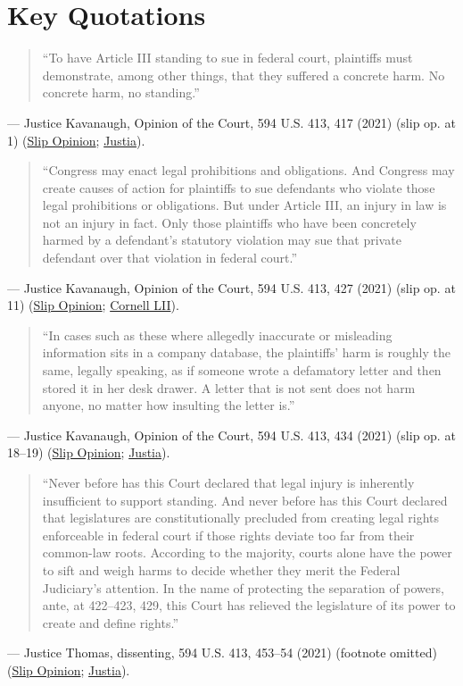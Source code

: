 \documentclass[12pt]{article}
\begin{document}
\section{Key Quotations}

\begin{quote}
``To have Article III standing to sue in federal court, plaintiffs must demonstrate, among other things, that they suffered a concrete harm. No concrete harm, no standing.''
\end{quote}
\noindent --- Justice Kavanaugh, Opinion of the Court, 594 U.S. 413, 417 (2021) (slip op. at 1) (\href{https://www.supremecourt.gov/opinions/20pdf/20-297_4g25.pdf}{Slip Opinion}; \href{https://supreme.justia.com/cases/federal/us/594/20-297/}{Justia}).

\begin{quote}
``Congress may enact legal prohibitions and obligations. And Congress may create causes of action for plaintiffs to sue defendants who violate those legal prohibitions or obligations. But under Article III, an injury in law is not an injury in fact. Only those plaintiffs who have been concretely harmed by a defendant's statutory violation may sue that private defendant over that violation in federal court.''
\end{quote}
\noindent --- Justice Kavanaugh, Opinion of the Court, 594 U.S. 413, 427 (2021) (slip op. at 11) (\href{https://www.supremecourt.gov/opinions/20pdf/20-297_4g25.pdf}{Slip Opinion}; \href{https://www.law.cornell.edu/supremecourt/text/20-297}{Cornell LII}).

\begin{quote}
``In cases such as these where allegedly inaccurate or misleading information sits in a company database, the plaintiffs' harm is roughly the same, legally speaking, as if someone wrote a defamatory letter and then stored it in her desk drawer. A letter that is not sent does not harm anyone, no matter how insulting the letter is.''
\end{quote}
\noindent --- Justice Kavanaugh, Opinion of the Court, 594 U.S. 413, 434 (2021) (slip op. at 18--19) (\href{https://www.supremecourt.gov/opinions/20pdf/20-297_4g25.pdf}{Slip Opinion}; \href{https://supreme.justia.com/cases/federal/us/594/20-297/}{Justia}).

\begin{quote}
``Never before has this Court declared that legal injury is inherently insufficient to support standing. And never before has this Court declared that legislatures are constitutionally precluded from creating legal rights enforceable in federal court if those rights deviate too far from their common-law roots. According to the majority, courts alone have the power to sift and weigh harms to decide whether they merit the Federal Judiciary's attention. In the name of protecting the separation of powers, ante, at 422--423, 429, this Court has relieved the legislature of its power to create and define rights.''
\end{quote}
\noindent --- Justice Thomas, dissenting, 594 U.S. 413, 453--54 (2021) (footnote omitted) (\href{https://www.supremecourt.gov/opinions/20pdf/20-297_4g25.pdf}{Slip Opinion}; \href{https://supreme.justia.com/cases/federal/us/594/20-297/}{Justia}).
\end{document}
